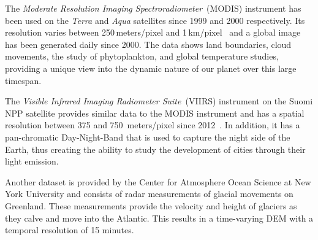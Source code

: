 \documentclass[journal]{vgtc}                %
\begin{document}
The \emph{Moderate Resolution Imaging Spectroradiometer}~(MODIS) instrument has been used on the \emph{Terra} and \emph{Aqua} satellites since 1999 and 2000 respectively.
Its resolution varies between 250\,meters/pixel and 1\,km/pixel~\cite{salomonson1989modis, justice2002overview} and a global image has been generated daily since 2000.
The data shows land boundaries, cloud movements, the study of phytoplankton, and global temperature studies, providing a unique view into the dynamic nature of our planet over this large timespan.

The \emph{Visible Infrared Imaging Radiometer Suite}~(VIIRS) instrument on the Suomi NPP satellite provides similar data to the MODIS instrument and has a spatial resolution between 375 and 750 \,meters/pixel since 2012~\cite{schueler2002npoess}.
In addition, it has a pan-chromatic Day-Night-Band that is used to capture the night side of the Earth, thus creating the ability to study the development of cities through their light emission.

Another dataset is provided by the Center for Atmosphere Ocean Science at New York University and consists of radar measurements of glacial movements on Greenland. These measurements provide the velocity and height of glaciers as they calve and move into the Atlantic. This results in a time-varying DEM with a temporal resolution of 15 minutes.
\end{document}
